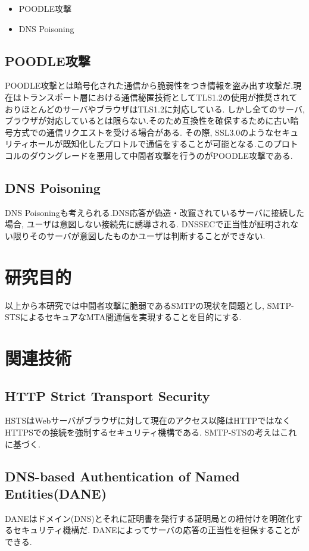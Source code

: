 \documentclass[a4j, 10pt, uplatex]{jsarticle}
\begin{document}
\begin{itemize}
\item POODLE攻撃 
\item DNS Poisoning
\end{itemize}

\subsection{POODLE攻撃}
POODLE攻撃とは暗号化された通信から脆弱性をつき情報を盗み出す攻撃だ.現在はトランスポート層における通信秘匿技術としてTLS1.2の使用が推奨されておりほとんどのサーバやブラウザはTLS1.2に対応している. しかし全てのサーバ, ブラウザが対応しているとは限らない.そのため互換性を確保するために古い暗号方式での通信リクエストを受ける場合がある. その際, SSL3.0のようなセキュリティホールが既知化したプロトルで通信をすることが可能となる.このプロトコルのダウングレードを悪用して中間者攻撃を行うのがPOODLE攻撃である.

\subsection{DNS Poisoning}
DNS Poisoningも考えられる.DNS応答が偽造・改竄されているサーバに接続した場合, ユーザは意図しない接続先に誘導される. DNSSECで正当性が証明されない限りそのサーバが意図したものかユーザは判断することができない.

\section{研究目的}

以上から本研究では中間者攻撃に脆弱であるSMTPの現状を問題とし, SMTP-STSによるセキュアなMTA間通信を実現することを目的にする.


\section{関連技術}


\subsection{HTTP Strict Transport Security}
HSTSはWebサーバがブラウザに対して現在のアクセス以降はHTTPではなくHTTPSでの接続を強制するセキュリティ機構である. SMTP-STSの考えはこれに基づく.

\subsection{DNS-based Authentication of Named Entities(DANE)}
DANEはドメイン(DNS)とそれに証明書を発行する証明局との紐付けを明確化するセキュリティ機構だ. DANEによってサーバの応答の正当性を担保することができる.
\end{document}
